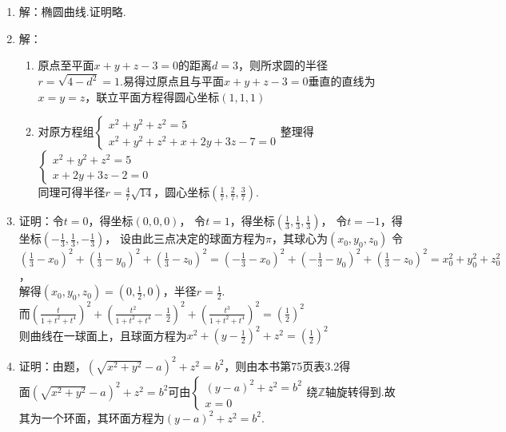\documentclass[UTF8]{ctexart}
\begin{document}
\begin{enumerate}
\item 解：椭圆曲线.证明略.

\item 解：\begin{enumerate}[(1)]
\item 原点至平面$x+y+z-3=0$的距离$d=3$，则所求圆的半径$r=\sqrt{4-d^2}=1$.易得过原点且与平面$x+y+z-3=0$垂直的直线为$x=y=z$，联立平面方程得圆心坐标$\left(1,1,1\right)$
\item 对原方程组$\left\{\begin{array}{l}x^2+y^2+z^2=5\\x^2+y^2+z^2+x+2y+3z-7=0\end{array}\right.$整理得$\left\{\begin{array}{l}x^2+y^2+z^2=5\\x+2y+3z-2=0\end{array}\right.$\\同理可得半径$r=\displaystyle\frac{4}{7}\sqrt{14}$，圆心坐标$\left(\displaystyle\frac{1}{7},\displaystyle\frac{2}{7},\displaystyle\frac{3}{7}\right)$.
\end{enumerate}

\item 证明：令$t=0$，得坐标$\left(0,0,0\right)$，
令$t=1$，得坐标$\left(\displaystyle\frac{1}{3},\displaystyle\frac{1}{3},\displaystyle\frac{1}{3}\right)$，
令$t=-1$，得坐标$\left(-\displaystyle\frac{1}{3},\displaystyle\frac{1}{3},-\displaystyle\frac{1}{3}\right)$，
设由此三点决定的球面方程为$\pi$，其球心为$\left(x_0,y_0,z_0\right)$
令$\left(\displaystyle\frac{1}{3}-x_0\right)^2+\left(\displaystyle\frac{1}{3}-y_0\right)^2+\left(\displaystyle\frac{1}{3}-z_0\right)^2=\left(-\displaystyle\frac{1}{3}-x_0\right)^2+\left(-\displaystyle\frac{1}{3}-y_0\right)^2+\left(\displaystyle\frac{1}{3}-z_0\right)^2=x_0^2+y_0^2+z_0^2$，\\解得$\left(x_0,y_0,z_0\right)=\left(0,\displaystyle\frac{1}{2},0\right)$，半径$r=\displaystyle\frac{1}{2}$.\\
而$\left(\displaystyle\frac{t}{1+t^2+t^4}\right)^2+\left(\displaystyle\frac{t^2}{1+t^2+t^4}-\displaystyle\frac{1}{2}\right)^2+\left(\displaystyle\frac{t^3}{1+t^2+t^4}\right)^2=\left(\displaystyle\frac{1}{2}\right)^2$\\
则曲线在一球面上，且球面方程为$x^2+\left(y-\displaystyle\frac{1}{2}\right)^2+z^2=\left(\displaystyle\frac{1}{2}\right)^2$

\item 证明：由题，$\left(\sqrt{x^2+y^2}-a\right)^2+z^2=b^2$，则由本书第75页表3.2得\\
面$\left(\sqrt{x^2+y^2}-a\right)^2+z^2=b^2$可由$\left\{\begin{array}{l}\left(y-a\right)^2+z^2=b^2\\x=0\end{array}\right.$绕$\mathbb{Z}$轴旋转得到.故其为一个环面，其环面方程为$\left(y-a\right)^2+z^2=b^2$.


\end{enumerate}
\end{document}
